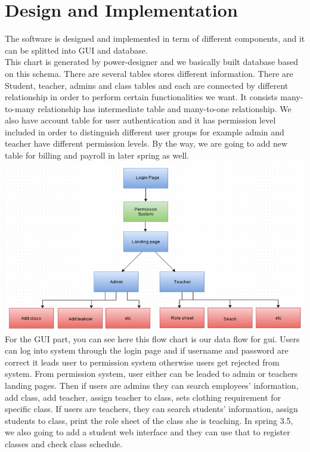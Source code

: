 
\chapter{Design  and Implementation}
The software is designed and implemented in term of different components, and it can be splitted into GUI and database. \\


This chart is generated by power-designer and we basically built database based on this schema. There are several tables stores different information. There are Student, teacher, admins and class tables and each are connected by different relationship in order to perform certain functionalities we want. It consists many-to-many relationship has intermediate table and many-to-one relationship. We also have account table for user authentication and it has permission level included in order to distinguish different user groups for example admin and teacher have different permission levels. By the way, we are going to add new table for billing and payroll in later spring as well.\\
\includegraphics[scale=0.5]{pics/gui.png}\\
For the GUI part, you can see here this flow chart is our data flow for gui. Users can log into system through the login page and if username and password are correct it leads user to permission system otherwise users get rejected from system. From permission system, user either can be leaded to admin or teachers landing pages. Then if users are admins they can search employees’ information, add class, add teacher, assign teacher to class, sets clothing requirement for specific class. If users are teachers, they can search students’ information, assign students to class, print the role sheet of the class she is teaching.
In spring 3.5, we also going to add a student web interface and they can use that to register classes and check class schedule. 
\\


